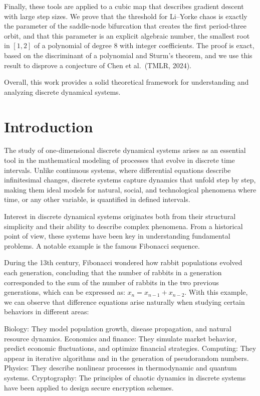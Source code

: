\documentclass[12pt,a4paper]{report}
\theoremstyle{definition}
\begin{document}
Finally, these tools are applied to a cubic map that describes gradient descent with large step sizes. We prove that the threshold for Li--Yorke chaos is exactly the parameter of the saddle-node bifurcation that creates the first period-three orbit, and that this parameter is an explicit algebraic number, the smallest root in $[1,2]$ of a polynomial of degree $8$ with integer coefficients. The proof is exact, based on the discriminant of a polynomial and Sturm's theorem, and we use this result to disprove a conjecture of Chen et al.\ (TMLR, 2024).

Overall, this work provides a solid theoretical framework for understanding and analyzing discrete dynamical systems.

\chapter*{Introduction}

The study of one-dimensional discrete dynamical systems arises as an essential tool in the mathematical modeling of processes that evolve in discrete time intervals. Unlike continuous systems, where differential equations describe infinitesimal changes, discrete systems capture dynamics that unfold step by step, making them ideal models for natural, social, and technological phenomena where time, or any other variable, is quantified in defined intervals.

Interest in discrete dynamical systems originates both from their structural simplicity and their ability to describe complex phenomena. From a historical point of view, these systems have been key in understanding fundamental problems. A notable example is the famous Fibonacci sequence.

During the 13th century, Fibonacci wondered how rabbit populations evolved each generation, concluding that the number of rabbits in a generation corresponded to the sum of the number of rabbits in the two previous generations, which can be expressed as: $x_n = x_{n-1} + x_{n-2}$. With this example, we can observe that difference equations arise naturally when studying certain behaviors in different areas:

Biology: They model population growth, disease propagation, and natural resource dynamics.
Economics and finance: They simulate market behavior, predict economic fluctuations, and optimize financial strategies.
Computing: They appear in iterative algorithms and in the generation of pseudorandom numbers.
Physics: They describe nonlinear processes in thermodynamic and quantum systems.
Cryptography: The principles of chaotic dynamics in discrete systems have been applied to design secure encryption schemes.
\end{document}
